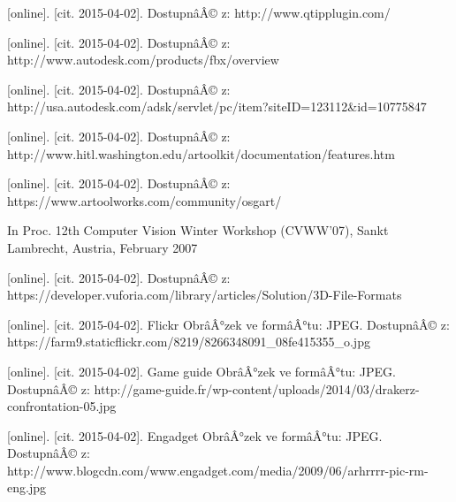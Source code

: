 \documentclass[twoside,12pt]{article}
\begin{document}
\begin{literatura}
{
	 [online]. [cit. 2015-04-02]. DostupnâÂ© z: http://www.qtipplugin.com/
}

{
	 [online]. [cit. 2015-04-02]. DostupnâÂ© z: http://www.autodesk.com/products/fbx/overview
}

{
	 [online]. [cit. 2015-04-02]. DostupnâÂ© z: http://usa.autodesk.com/adsk/servlet/pc/item?siteID=123112\&id=10775847
}

{
	 [online]. [cit. 2015-04-02]. DostupnâÂ© z: http://www.hitl.washington.edu/artoolkit/documentation/features.htm
}

{
	 [online]. [cit. 2015-04-02]. DostupnâÂ© z: https://www.artoolworks.com/community/osgart/
}

{
In Proc. 12th Computer Vision Winter Workshop (CVWW'07), Sankt Lambrecht, Austria, February 2007
}

{
	 [online]. [cit. 2015-04-02]. DostupnâÂ© z: https://developer.vuforia.com/library/articles/Solution/3D-File-Formats
}





{
	[online]. [cit. 2015-04-02]. Flickr
	ObrâÂ°zek ve formâÂ°tu: JPEG. DostupnâÂ© z: https://farm9.staticflickr.com/8219/8266348091\_08fe415355\_o.jpg
}

{
	[online]. [cit. 2015-04-02]. Game guide
	ObrâÂ°zek ve formâÂ°tu: JPEG. DostupnâÂ© z: http://game-guide.fr/wp-content/uploads/2014/03/drakerz-confrontation-05.jpg
}

{
	[online]. [cit. 2015-04-02]. Engadget
	ObrâÂ°zek ve formâÂ°tu: JPEG. DostupnâÂ© z: http://www.blogcdn.com/www.engadget.com/media/2009/06/arhrrrr-pic-rm-eng.jpg
}


\end{literatura}
\end{document}
